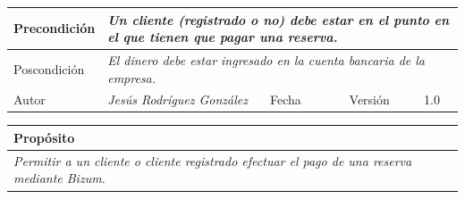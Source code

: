 \begin{table}[H]
\begin{tabular}{llllllll}
        \multicolumn{1}{|l|}{Precondición}                           & \multicolumn{7}{p{10cm}|}{{\color[HTML]{808080} \textit{Un cliente (registrado o no) debe estar en el punto en el que tienen que pagar una reserva.}}}                                                                                                                                                                                                                                   \\ \hline
        \multicolumn{1}{|l|}{Poscondición}                           & \multicolumn{7}{p{10cm}|}{{\color[HTML]{808080} \textit{El dinero debe estar ingresado en la cuenta bancaria de la empresa.}}}                                                                                                                                                                                                                                                       \\ \hline
        \multicolumn{1}{|l|}{Autor}                                  & \multicolumn{1}{l|}{{\color[HTML]{808080} \textit{Jesús Rodríguez González}}}                           & \multicolumn{2}{l|}{Fecha}                                                   & \multicolumn{1}{l|}{}                          & \multicolumn{2}{l|}{Versión}                                                      & \multicolumn{1}{l|}{1.0}                                                     \\ \hline
        \end{tabular}
    \end{table}

    \begin{table}[H]
        \begin{tabular}{llllllll}
    \hline
    \multicolumn{8}{|l|}{\cellcolor[HTML]{F2F2F2}Propósito}                                                                                                                                                                                                                                                                                                                                                                                           \\ \hline
    \multicolumn{8}{|p{15cm}|}{{\color[HTML]{808080} \textit{Permitir a un cliente o cliente registrado efectuar el pago de una reserva mediante Bizum.}}}                                                                                                                                                                                                             \\ \hline
    \end{tabular}
    \end{table}

